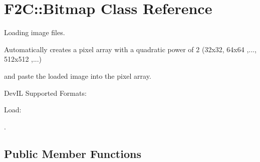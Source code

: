 \hypertarget{class_f2_c_1_1_bitmap}{
\section{F2C::Bitmap Class Reference}
\label{class_f2_c_1_1_bitmap}
}


Loading image files. \par
 Automatically creates a pixel array with a quadratic power of 2 (32x32, 64x64 ,..., 512x512 ,...) \par
 and paste the loaded image into the pixel array. \par
 DevIL Supported Formats: \par
 Load: \par
.  


\subsection*{Public Member Functions}

